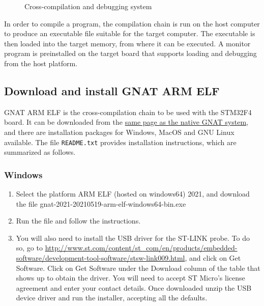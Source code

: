 \begin{figure}[hbtp!]
    \caption{Cross-compilation and debugging system}
    \label{fig:cross}
\end{figure}

In order to compile a program, the compilation chain is run on the host computer to produce an executable file suitable for the target computer.
The executable is then loaded into the target memory,
from where it can be executed.
A monitor program is preinstalled on the target board
that supports loading and debugging from the host platform.

\subsection{Download and install GNAT ARM ELF}

GNAT ARM ELF is the cross-compilation chain to be used with the STM32F4 board. It can be downloaded from the
\href{https://www.adacore.com/download/more}{same page as the native GNAT system},
and there are installation packages for Windows, MacOS and GNU Linux available.
The file \texttt{README.txt} provides installation instructions,
which are summarized as follows.

\subsubsection*{Windows}
\begin{enumerate}
\item Select the platform ARM ELF (hosted on windows64) 2021, and download the file
gnat-2021-20210519-arm-elf-windows64-bin.exe
\item Run the file and follow the instructions.
\item You will also need to install the USB driver for the ST-LINK probe. To do so, go to \url{http://www.st.com/content/st\_com/en/products/embedded-software/development-tool-software/stsw-link009.html}, and click on Get Software. Click on Get Software under the Download column of the table that shows up to obtain the driver. You will need to accept ST Micro’s license agreement and enter your contact details. 
Once downloaded unzip the USB device driver and run the installer, accepting all the defaults.
\end{enumerate}
